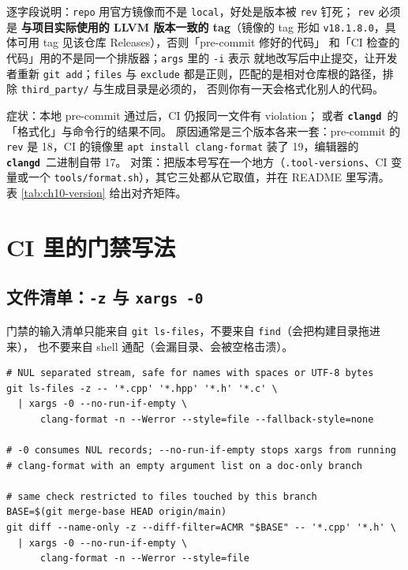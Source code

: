 \documentclass[12pt,a4paper,fontset=fandol]{ctexbook}
\newcommand{\Lib}[1]{\textbf{\texttt{#1}}}
\newcommand{\CD}{\Lib{clangd}}
\begin{document}
逐字段说明：\texttt{repo} 用官方镜像而不是 \texttt{local}，好处是版本被 \texttt{rev} 钉死；
\texttt{rev} 必须是 \textbf{与项目实际使用的 LLVM 版本一致的 tag}（镜像的 tag 形如
\texttt{v18.1.8.0}，具体可用 tag 见该仓库 Releases），否则「pre-commit 修好的代码」
和「CI 检查的代码」用的不是同一个排版器；\texttt{args} 里的 \texttt{-i} 表示
就地改写后中止提交，让开发者重新 \texttt{git add}；\texttt{files} 与 \texttt{exclude}
都是正则，匹配的是相对仓库根的路径，排除 \texttt{third\_party/} 与生成目录是必须的，
否则你有一天会格式化别人的代码。

\begin{note}[title={\texttt{rev} 对齐：pre-commit、CI、编辑器三者同一个版本}]
  症状：本地 pre-commit 通过后，CI 仍报同一文件有 violation；
  或者 \CD\ 的「格式化」与命令行的结果不同。
  原因通常是三个版本各来一套：pre-commit 的 \texttt{rev} 是 18，CI 的镜像里
  \texttt{apt install clang-format} 装了 19，编辑器的 \CD\ 二进制自带 17。
  对策：把版本号写在一个地方（\texttt{.tool-versions}、CI 变量或一个
  \texttt{tools/format.sh}），其它三处都从它取值，并在 README 里写清。
  表 \ref{tab:ch10-version} 给出对齐矩阵。
\end{note}

\section{CI 里的门禁写法}\label{sec:ch10-s5}

\subsection{文件清单：\texttt{-z} 与 \texttt{xargs -0}}\label{sec:ch10-s5-list}

门禁的输入清单只能来自 \texttt{git ls-files}，不要来自 \texttt{find}（会把构建目录拖进来），
也不要来自 shell 通配（会漏目录、会被空格击溃）。

\begin{lstlisting}[style=shellstyle,caption={空格与中文文件名的正确处理},label={lst:ch10-xargs}]
# NUL separated stream, safe for names with spaces or UTF-8 bytes
git ls-files -z -- '*.cpp' '*.hpp' '*.h' '*.c' \
  | xargs -0 --no-run-if-empty \
      clang-format -n --Werror --style=file --fallback-style=none

# -0 consumes NUL records; --no-run-if-empty stops xargs from running
# clang-format with an empty argument list on a doc-only branch

# same check restricted to files touched by this branch
BASE=$(git merge-base HEAD origin/main)
git diff --name-only -z --diff-filter=ACMR "$BASE" -- '*.cpp' '*.h' \
  | xargs -0 --no-run-if-empty \
      clang-format -n --Werror --style=file
\end{lstlisting}
\end{document}
